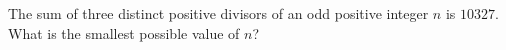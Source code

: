 The sum of three distinct positive divisors of an odd positive integer $n$ is $10327$. What is the smallest possible value of $n$?
